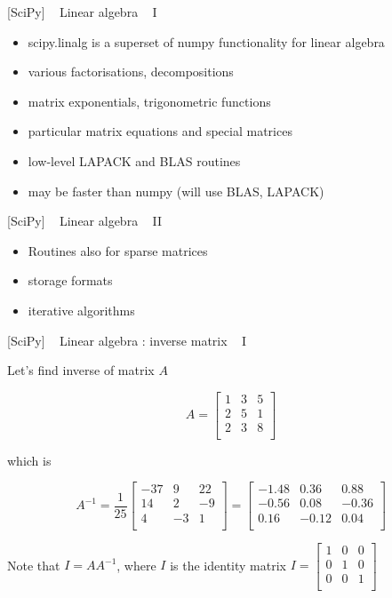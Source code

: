 \documentclass{article}
\begin{document}
    {[}SciPy{]} ~ Linear algebra ~ I

\begin{itemize}
\itemsep1pt\parskip0pt
\item
  scipy.linalg is a superset of numpy functionality for linear algebra
\item
  various factorisations, decompositions
\item
  matrix exponentials, trigonometric functions
\item
  particular matrix equations and special matrices
\item
  low-level LAPACK and BLAS routines
\item
  may be faster than numpy (will use BLAS, LAPACK)
\end{itemize}

    {[}SciPy{]} ~ Linear algebra ~ II

\begin{itemize}
\itemsep1pt\parskip0pt
\item
  Routines also for sparse matrices
\item
  storage formats
\item
  iterative algorithms
\end{itemize}

    {[}SciPy{]} ~ Linear algebra : inverse matrix ~ I

Let's find inverse of matrix $A$

\[A = 
\left[ \begin{array}
{rrr}
1 & 3 & 5 \\
 2 & 5 & 1 \\
 2 & 3 & 8 \\
\end{array} \right]
\]

which is

\[A^{-1} = 
\frac{1}{25} \left[ \begin{array}
{rrr}
-37 & 9 & 22\\
14 & 2 & -9 \\ 
4 & -3 & 1\\
\end{array} \right]
= 
\left[ \begin{array}
{rrr}
-1.48 & 0.36 &  0.88\\
-0.56 &  0.08 & -0.36 \\ 
0.16 & -0.12 &  0.04\\
\end{array} \right]
\]

Note that $I = A A^{-1}$, where $I$ is the identity matrix
$I =  \left[ \begin{array} {rrr} 1 & 0 & 0 \\ 0 &  1 & 0 \\  0 & 0 & 1\\ \end{array} \right] $
\end{document}
